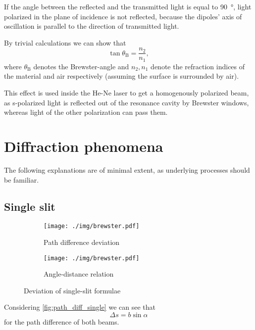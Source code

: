 If the angle between the reflected and the transmitted light is equal to \SI{90}{\degree}, light polarized in the plane of incidence is not reflected, because the dipoles' axis of oscillation is parallel to the direction of transmitted light.

By trivial calculations we can show that
\begin{equation}\label{eq:brewster}
	\tan\theta_\text{B}=\frac{n_2}{n_1},
\end{equation}
where $\theta_\text{B}$ denotes the Brewster-angle and $n_2, n_1$ denote the refraction indices of the material and air respectively (assuming the surface is surrounded by air).

This effect is used inside the He-Ne laser to get a homogenously polarized beam, as s-polarized light is reflected out of the resonance cavity by Brewster windows, whereas light of the other polarization can pass them.

\section{Diffraction phenomena}
The following explanations are of minimal extent, as underlying processes should be familiar.

\subsection{Single slit}\label{subsec:single_slit}

\begin{figure}[tb]
	\begin{subfigure}{.51\textwidth}
		\centering
		\texttt{[image: ./img/brewster.pdf]}
		\caption[Single slit I]{Path difference deviation}
		\label{fig:path_diff_single}
	\end{subfigure}
	\begin{subfigure}{.51\textwidth}
		\centering
		\texttt{[image: ./img/brewster.pdf]}
		\caption[Single slit II]{Angle-distance relation}
		\label{fig:angle_distance_single}
	\end{subfigure}
	\caption[Deviation of single-slit formulae]{Deviation of single-slit formulae}
\end{figure}

Considering \autoref{fig:path_diff_single} we can see that	%
\begin{equation}\label{eq:path_diff}
	\Delta s=b\sin\alpha
\end{equation}
for the path difference of both beams.

